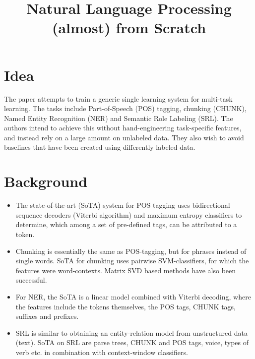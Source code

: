 \documentclass[12pt]{article}
\begin{document}
\title{Natural Language Processing (almost) from Scratch}
\author{}
\date{}
\maketitle

\section{Idea}
  The paper attempts to train a generic single learning system for multi-task learning. The tasks include Part-of-Speech (POS) tagging, chunking (CHUNK), Named Entity Recognition (NER) and Semantic Role Labeling (SRL). The authors intend to achieve this without hand-engineering task-specific features, and instead rely on a large amount on unlabeled data. They also wish to avoid baselines that have been created using differently labeled data.

\section{Background}
  \begin{itemize}
    \item The state-of-the-art (SoTA) system for POS tagging uses bidirectional sequence decoders (Viterbi algorithm) and maximum entropy classifiers to determine, which among a set of pre-defined tags, can be attributed to a token.
    \item Chunking is essentially the same as POS-tagging, but for phrases instead of single words. SoTA for chunking uses pairwise SVM-classifiers, for which the features were word-contexts. Matrix SVD based methods have also been successful.
    \item For NER, the SoTA is a linear model combined with Viterbi decoding, where the features include the tokens themselves, the POS tags, CHUNK tags, suffixes and prefixes.
    \item SRL is similar to obtaining an entity-relation model from unstructured data (text). SoTA on SRL are parse trees, CHUNK and POS tags, voice, types of verb etc. in combination with context-window classifiers.        
  \end{itemize}
\end{document}
